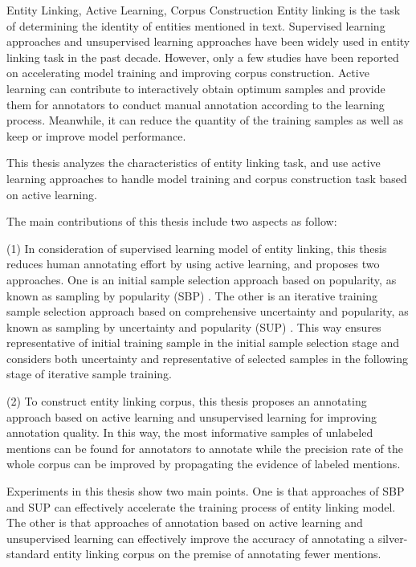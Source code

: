 \begin{englishabstract}{Entity Linking, Active Learning, Corpus Construction}
	Entity linking is the task of determining the identity of entities mentioned in text. Supervised learning approaches and unsupervised learning approaches have been widely used in entity linking task in the past decade. However, only a few studies have been reported on accelerating model training and improving corpus construction. Active learning can contribute to interactively obtain optimum samples and provide them for annotators to conduct manual annotation according to the learning process. Meanwhile, it can reduce the quantity of the training samples as well as keep or improve model performance.
	
	This thesis analyzes the characteristics of entity linking task, and use active learning approaches to handle model training and corpus construction task based on active learning.
	
	The main contributions of this thesis include two aspects as follow:
	
	(1) In consideration of supervised learning model of entity linking, this thesis reduces human annotating effort by using active learning, and proposes two approaches. One is an initial sample selection approach based on popularity, as known as sampling by popularity (SBP) . The other is an iterative training sample selection approach based on comprehensive uncertainty and popularity, as known as sampling by uncertainty and popularity (SUP) . This way ensures representative of initial training sample in the initial sample selection stage and considers both uncertainty and representative of selected samples in the following stage of iterative sample training.
	
	(2) To construct entity linking corpus, this thesis proposes an annotating approach based on active learning and unsupervised learning for improving annotation quality. In this way, the most informative samples of unlabeled mentions can be found for annotators to annotate while the precision rate of the whole corpus can be improved by propagating the evidence of labeled mentions.
	
	Experiments in this thesis show two main points. One is that approaches of SBP and SUP can effectively accelerate the training process of entity linking model. The other is that approaches of annotation based on active learning and unsupervised learning can effectively improve the accuracy of annotating a silver-standard entity linking corpus on the premise of annotating fewer mentions.
\end{englishabstract}
